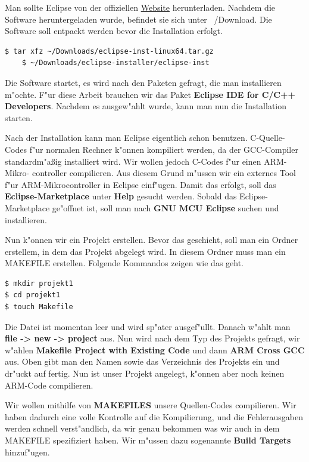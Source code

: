 Man sollte Eclipse von der offiziellen
\href{https://www.eclipse.org/downloads/}{Website}  herunterladen. Nachdem 
die Software heruntergeladen wurde, befindet sie sich unter 
~/Download. Die Software soll entpackt werden bevor die Installation 
erfolgt.
\begin{lstlisting}[frame=single]
	$ tar xfz ~/Downloads/eclipse-inst-linux64.tar.gz
	$ ~/Downloads/eclipse-installer/eclipse-inst
\end{lstlisting}

Die Software startet, es wird nach den Paketen gefragt, die man 
installieren m"ochte. F"ur diese Arbeit brauchen wir das Paket 
\textbf{Eclipse IDE for C/C++ Developers}. Nachdem es ausgew"ahlt 
wurde, kann man nun die Installation starten.
  
Nach der Installation kann man Eclipse eigentlich schon benutzen. 
C-Quelle-Codes f"ur normalen Rechner k"onnen kompiliert werden, da der 
GCC-Compiler standardm"a\ss{}ig installiert wird. Wir wollen jedoch	 
C-Codes f"ur einen ARM-Mikro- controller compilieren. Aus diesem Grund 
m"ussen wir ein externes Tool f"ur ARM-Mikrocontroller in Eclipse 
einf"ugen. Damit das erfolgt, soll das 
\textbf{Eclipse-Marketplace} 
unter \textbf{Help} gesucht werden. Sobald das Eclipse-Marketplace ge"offnet 
ist, soll man nach \textbf{GNU MCU Eclipse} suchen und 
installieren.

Nun k"onnen wir ein Projekt erstellen. Bevor das geschieht, soll man 
ein Ordner erstellem, in dem das Projekt abgelegt wird. In diesem 
Ordner muss man ein MAKEFILE erstellen. Folgende Kommandos zeigen wie 
das geht.
\begin{lstlisting}[frame=single]
$ mkdir projekt1
$ cd projekt1
$ touch Makefile
\end{lstlisting}
Die Datei ist momentan leer und wird sp"ater ausgef"ullt. Danach w"ahlt
man \textbf{file -> new -> project} aus. Nun wird nach dem Typ des 
Projekts gefragt, wir w"ahlen \textbf{Makefile Project with Existing Code} und 
dann \textbf{ARM Cross GCC} aus. Oben gibt man den Namen  sowie das
Verzeichnis des Projekts ein und dr"uckt auf fertig. Nun ist unser 
Projekt angelegt, k"onnen aber noch keinen ARM-Code compilieren.

Wir wollen mithilfe von \textbf{MAKEFILES} unsere Quellen-Codes 
compilieren. Wir haben dadurch eine volle Kontrolle auf die 
Kompilierung, und die Fehlerausgaben werden schnell 
verst"andlich, da wir genau bekommen was wir auch in dem MAKEFILE 
spezifiziert haben. Wir m"ussen dazu sogenannte \textbf{Build Targets} 
hinzuf"ugen. 

